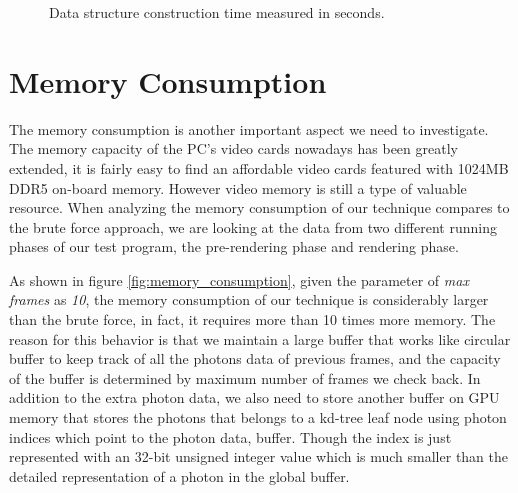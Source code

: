\begin{figure}[ftp]
    \centering
    \renewcommand{\thefigure}{\thechapter.\arabic{figure}}
    \caption[Data construction time performance]{Data structure construction time measured in seconds. }
    \label{fig:construction_time}
\end{figure}

\section{Memory Consumption}

The memory consumption is another important aspect we need to investigate. The memory capacity of the PC's video cards nowadays has been greatly extended, it is fairly easy to find an affordable video cards featured with 1024MB DDR5 on-board memory. However video memory is still a type of valuable resource. When analyzing the memory consumption of our technique compares to the brute force approach, we are looking at the data from two different running phases of our test program, the pre-rendering phase and rendering phase.

As shown in figure \ref{fig:memory_consumption}, given the parameter of \emph{max frames} as \emph{10}, the memory consumption of our technique is considerably larger than the brute force, in fact, it requires more than 10 times more memory. The reason for this behavior is that we maintain a large buffer that works like circular buffer to keep track of all the photons data of previous frames, and the capacity of the buffer is determined by maximum number of frames we check back. In addition to the extra photon data, we also need to store another buffer on GPU memory that stores the photons that belongs to a kd-tree leaf node using photon indices which point to the photon data, buffer. Though the index is just represented with an 32-bit unsigned integer value which is much smaller than the detailed representation of a photon in the global buffer.

